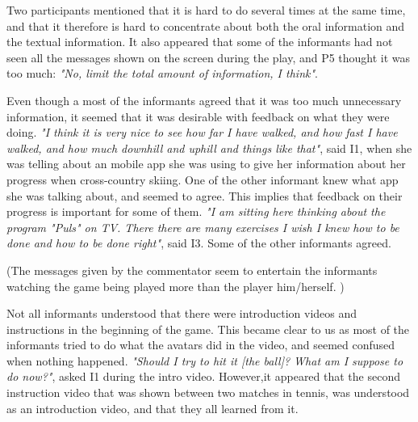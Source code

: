 Two participants mentioned that it is hard to do several times at the same time, and that it therefore is hard to concentrate about both the oral information and the textual information. It also appeared that some of the informants had not seen all the messages shown on the screen during the play, and P5 thought it was too much: \emph{"No, limit the total amount of information, I think"}. 


Even though a most of the informants agreed that it was too much unnecessary information, it seemed that it was desirable with feedback on what they were doing. \emph{"I think it is very nice to see how far I have walked, and how fast I have walked, and how much downhill and uphill and things like that"}, said I1, when she was telling about an mobile app she was using to give her information about her progress when cross-country skiing. One of the other informant knew what app she was talking about, and seemed to agree. This implies that feedback on their progress is important for some of them.  \emph{"I am sitting here thinking about the program "Puls" on TV. There there are many exercises I wish I knew how to be done and how to be done right"}, said I3. Some of the other informants agreed. 

(The messages given by the commentator seem to entertain the informants watching the game being played more than the player him/herself. )

Not all informants understood that there were introduction videos and instructions in the beginning of the game. This became clear to us as most of the informants tried to do what the avatars did in the video, and seemed confused when nothing happened. \emph{"Should I try to hit it [the ball]? What am I suppose to do now?"}, asked I1 during the intro video. However,it appeared that the second instruction video that was shown between two matches in tennis, was understood as an introduction video, and that they all learned from it.  


